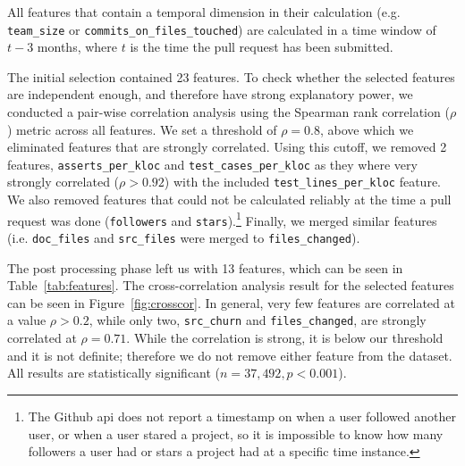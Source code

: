 \documentclass{sig-alternate}
\begin{document}
All features that contain a temporal dimension in their
calculation (e.g. \texttt{team\_size} or \texttt{commits\_on\_files\_touched})
are calculated in a time window of $t - 3$ months, where $t$ is the time the
pull request has been submitted. 

The initial selection contained 23 features. To check whe\-ther the selected
features are independent enough, and therefore have strong explanatory power, we
conducted a pair-wise correlation analysis using the Spearman rank correlation
($\rho$) metric across all features.  We set a threshold of $\rho = 0.8$, above
which we eliminated features that are strongly correlated. Using this cutoff, we
removed 2 features, \texttt{asserts\_per\_kloc} and
\texttt{test\_cases\_per\_kloc} as they where very strongly correlated ($\rho >
0.92$) with the included \texttt{test\_lines\_per\_kloc} feature. We also
removed features that could not be calculated reliably at the time a pull
request was done (\texttt{followers} and \texttt{stars}).\footnote{The Github
{\sc api} does not report a timestamp on when a user followed another user, or
when a user stared a project, so it is impossible to know how many followers a
user had or stars a project had at a specific time instance.} Finally, we
merged similar features (i.e. \texttt{doc\_files} and \texttt{src\_files} were merged to \texttt{files\_changed}). 

The post processing phase left us with
13 features, which can be seen in Table~\ref{tab:features}.
The cross-correlation analysis result for the selected features can be seen in
Figure~\ref{fig:crosscor}. In general, very few features are correlated at a
value $\rho > 0.2$, while only two, \texttt{src\_churn} and
\texttt{files\_changed}, are strongly correlated at $\rho = 0.71$. While the
correlation is strong, it is below our threshold and it is not definite;
therefore we do not remove either feature from the dataset. All results are
statistically significant ($n = 37,492, p < 0.001$).
\end{document}
